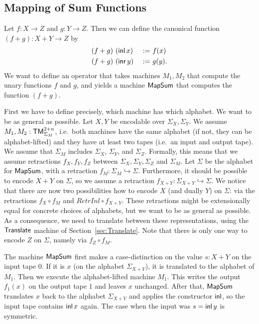 \subsection{Mapping of Sum Functions}
\label{sec:SumTM}

Let $f : X \to Z$ and $g : Y \to Z$.  Then we can define the canonical function $(f+g) : X+Y \to Z$ by
\begin{alignat*}{2}
  (f+g)&~(\operatorname{\mathsf{inl}} x)&~:=~& f(x) \\
  (f+g)&~(\operatorname{\mathsf{inr}} y)&~:=~& g(y).
\end{alignat*}
We want to define an operator that takes machines $M_1, M_2$ that compute the unary functions $f$ and $g$, and yields a machine $\mathsf{MapSum}$ that
computes the function $(f+g)$.

First we have to define precisely, which machine has which alphabet.  We want to be as general as possible.  Let $X, Y$ be encodable over
$\Sigma_X, \Sigma_Y$.  We assume $M_1, M_2 : \mathsf{TM}_{\Sigma_M}^{2+n}$, i.e.\ both machines have the same alphabet (if not, they can be alphabet-lifted)
and they have at least two tapes (i.e.\ an input and output tape).  We assume that $\Sigma_M$ includes $\Sigma_X$, $\Sigma_Y$, and $\Sigma_Z$.
Formally, this means that we assume retractions $f_X,f_Y,f_Z$ between $\Sigma_X, \Sigma_Y, \Sigma_Z$ and $\Sigma_M$.  Let $\Sigma$ be the alphabet for
$\mathsf{MapSum}$, with a retraction $f_M : \Sigma_M \hookrightarrow \Sigma$.  Furthermore, it should be possible to encode $X+Y$ on $\Sigma$, so we
assume a retraction $f_{X+Y} : \Sigma_{X+Y} \hookrightarrow \Sigma$.  We notice that there are now two possibilities how to encode $X$ (and dually
$Y$) on $\Sigma$: via the retractions $f_X \circ f_M$ and $RetrInl \circ f_{X+Y}$.  These retractions might be extensionally equal for concrete
choices of alphabets, but we want to be as general as possible.  As a consequence, we need to translate between these representations, using the
$\mathsf{Translate}$ machine of Section~\ref{sec:Translate}.  Note that there is only one way to encode $Z$ on $\Sigma$, namely via $f_Z \circ f_M$.

The machine $\mathsf{MapSum}$ first makes a case-distinction on the value $s:X+Y$ on the input tape $0$.  If it is $x$ (on the alphabet $\Sigma_{X+Y}$),
it is translated to the alphabet of $M_1$.  Then we execute the alphabet-lifted machine $M_1$.  This writes the output $f_1(x)$ on the output tape $1$
and leaves $x$ unchanged.  After that, $\mathsf{MapSum}$ translates $x$ back to the alphabet $\Sigma_{X+Y}$ and applies the constructor $\operatorname{\mathsf{inl}}$, so the
input tape contains $\operatorname{\mathsf{inl}} x$ again.  The case when the input was $s=\operatorname{\mathsf{inl}} y$ is symmetric.

